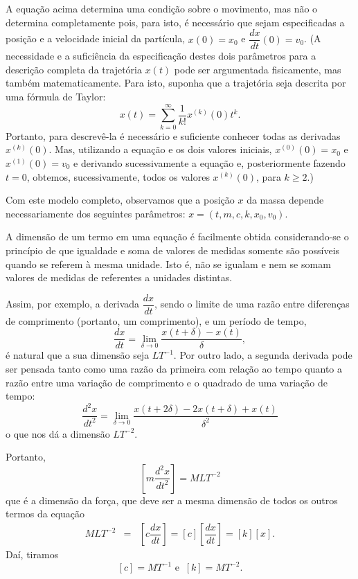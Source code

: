     A equação acima determina uma condição sobre o movimento, mas não o determina completamente pois, para isto, é necessário que sejam especificadas a posição e a velocidade inicial da partícula, \(x(0) = x_0\) e \(\dfrac{dx}{dt}(0) = v_0\). (A necessidade e a suficiência da especificação destes dois parâmetros para a descrição completa da trajetória \(x(t)\) pode ser argumentada fisicamente, mas também matematicamente. Para isto, suponha que a trajetória seja descrita por uma fórmula de Taylor:
    \[x(t) = \sum_{k = 0}^{\infty} \dfrac{1}{k!} x^{(k)}(0) t^{k}.\]
    Portanto, para descrevê-la é necessário e suficiente conhecer todas as derivadas \(x^{(k)}(0)\). Mas, utilizando a equação e os dois valores iniciais, \(x^{(0)}(0) = x_0\) e \(x^{(1)}(0) = v_0\) e derivando sucessivamente a equação e, posteriormente fazendo \(t = 0\), obtemos, sucessivamente, todos os valores \(x^{(k)}(0)\), para \(k \ge 2\).)

    Com este modelo completo, observamos que a posição \(x\) da massa depende necessariamente dos seguintes parâmetros: \(x = (t, m, c, k, x_0, v_0)\).

    A dimensão de um termo em uma equação é facilmente obtida considerando-se o princípio de que igualdade e soma de valores de medidas somente são possíveis quando se referem à mesma unidade. Isto é, não se igualam e nem se somam valores de medidas de referentes a unidades distintas.

    Assim, por exemplo, a derivada \(\dfrac{dx}{dt}\), sendo o limite de uma razão entre diferenças de comprimento (portanto, um comprimento), e um período de tempo, \[\dfrac{dx}{dt} = \displaystyle\lim_{\delta \to 0} \dfrac{x(t+\delta)-x(t)}{\delta},\] é natural que a sua dimensão seja \(LT^{-1}\). Por outro lado, a segunda derivada pode ser pensada tanto como uma razão da primeira com relação ao tempo quanto a razão entre uma variação de comprimento e o quadrado de uma variação de tempo: \[\dfrac{d^2x}{dt^{2}} = \lim_{\delta \to 0} \dfrac{x(t+2\delta) - 2x(t+\delta)+x(t)}{\delta^2}\] o que nos dá a dimensão \(LT^{-2}\).
    
    Portanto,
    \[\left[m \dfrac{d^2x}{dt^{2}} \right] = MLT^{-2}\]
    que é a dimensão da força, que deve ser a mesma dimensão de todos os outros termos da equação 
    \[\begin{array}{rcl}
    MLT^{-2}
    &=& \left[c \dfrac{dx}{dt}\right] = [c] \left[\dfrac{dx}{dt}\right] = [k] [x].
    \end{array}\]
    Daí, tiramos
    \[[c] = MT^{-1} \mbox{  e  }\ [k] = MT^{-2}.\]




